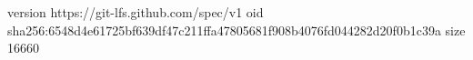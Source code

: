 version https://git-lfs.github.com/spec/v1
oid sha256:6548d4e61725bf639df47c211ffa47805681f908b4076fd044282d20f0b1c39a
size 16660
